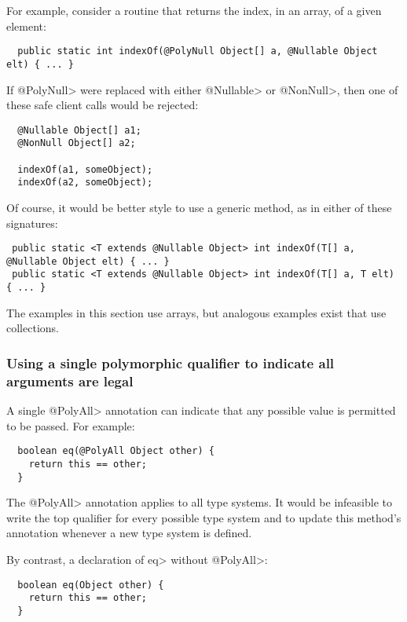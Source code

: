 For example, consider a routine that returns the index, in an array, of a
given element:

\begin{Verbatim}
  public static int indexOf(@PolyNull Object[] a, @Nullable Object elt) { ... }
\end{Verbatim}

If \<@PolyNull> were replaced with either \<@Nullable> or \<@NonNull>, then
one of these safe client calls would be rejected:

\begin{Verbatim}
  @Nullable Object[] a1;
  @NonNull Object[] a2;

  indexOf(a1, someObject);
  indexOf(a2, someObject);
\end{Verbatim}

Of course, it would be better style to use a generic method, as in either
of these signatures:

\begin{Verbatim}
 public static <T extends @Nullable Object> int indexOf(T[] a, @Nullable Object elt) { ... }
 public static <T extends @Nullable Object> int indexOf(T[] a, T elt) { ... }
\end{Verbatim}

The examples in this section use arrays, but analogous examples exist that
use collections.


\subsubsection{Using a single polymorphic qualifier to indicate all arguments are legal\label{qualifier-polymorphism-top-type}}

A single \<@PolyAll> annotation can indicate that any possible value is
permitted to be passed.  For example:

\begin{Verbatim}
  boolean eq(@PolyAll Object other) {
    return this == other;
  }
\end{Verbatim}

\noindent
The \<@PolyAll> annotation applies to all type systems.
It would be infeasible to write the top qualifier for every possible type
system and to update this method's annotation whenever a new type system is
defined.

By contrast, a declaration of \<eq> without \<@PolyAll>:

\begin{Verbatim}
  boolean eq(Object other) {
    return this == other;
  }
\end{Verbatim}

